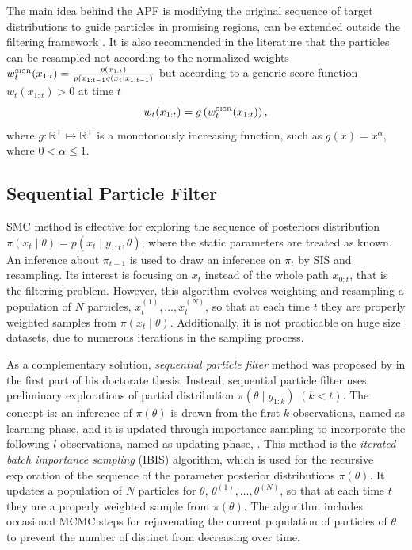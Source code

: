 The main idea behind the APF is modifying the original sequence of target distributions to guide particles in promising regions, can be extended outside the filtering framework \citep{JOHANSEN20081498}. It is also recommended in the literature \citep{liu2008monte} that the particles can be resampled not according to the normalized weights $w_t^{\mbox{\tiny SISR}}(x_{1:t})=\frac{p(x_{1:t})}{ p(x_{1:t-1}q(x_t\mid x_{1:t-1})  }$  but according to a generic score function $w_t(x_{1:t})>0$ at time $t$
\begin{equation*}
w_t(x_{1:t}) = g\left(w_t^{\mbox{\tiny SISR}}(x_{1:t})\right),
\end{equation*}
where $g: \mathbb{R}^+\mapsto \mathbb{R}^+$ is a monotonously increasing function, such as $g(x)=x^\alpha$, where $0<\alpha\leq 1$. 



\subsection{Sequential Particle Filter}


SMC method is effective for exploring the sequence of posteriors distribution  $\pi(x_t\mid\theta) = p(x_t\mid y_{1:t},\theta)$, where the static parameters are treated as known. An inference about $\pi_{t-1}$ is used to draw an inference on $\pi_t$ by SIS and resampling. Its interest is focusing on $x_t$ instead of the whole path $x_{0:t}$, that is the filtering problem. However, this algorithm evolves weighting and resampling a population of $N$ particles, $x_t^{(1)},\ldots,x_t^{(N)}$, so that at each time $t$ they are properly weighted samples from $\pi(x_t \mid \theta)$. Additionally, it is not practicable on huge size datasets, due to numerous iterations in the sampling process. 

As a complementary solution, \textit{sequential particle filter} method was proposed by \cite{chopin2002sequential} in the first part of his doctorate thesis. Instead, sequential particle filter uses preliminary explorations of partial distribution $\pi(\theta\mid y_{1:k})$ $(k<t)$. The concept is: an inference of $\pi(\theta)$ is drawn from the first $k$ observations, named as learning phase, and it is updated through importance sampling to incorporate the following $l$ observations, named as updating phase, \citep{chopin2002sequential}.  This method is the \textit{iterated batch importance sampling} (IBIS) algorithm, which is used for the recursive exploration of the sequence of the parameter posterior distributions $\pi(\theta)$. It updates a population of $N$ particles for $\theta$, $\theta^{(1)}, \ldots, \theta^{(N)}$, so that at each time $t$ they are a properly weighted sample from $\pi(\theta)$. The algorithm includes occasional MCMC steps for rejuvenating the current population of particles of $\theta$  to prevent the number of distinct from decreasing over time. 

